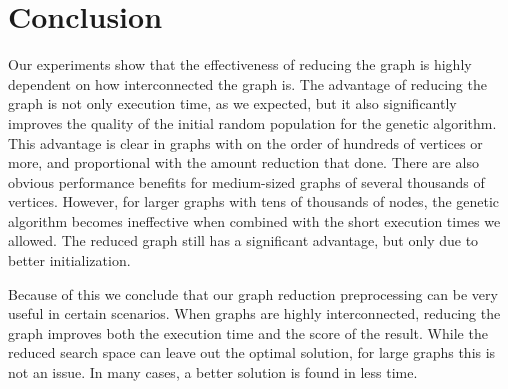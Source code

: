 \section{Conclusion}
\label{sec:conclusion}
Our experiments show that the effectiveness of reducing the graph is highly dependent on how interconnected the graph is. The advantage of reducing the graph is not only execution time, as we expected, but it also significantly improves the quality of the initial random population for the genetic algorithm. This advantage is clear in graphs with on the order of hundreds of vertices or more, and proportional with the amount reduction that done. There are also obvious performance benefits for medium-sized graphs of several thousands of vertices. However, for larger graphs with tens of thousands of nodes, the genetic algorithm becomes ineffective when combined with the short execution times we allowed. The reduced graph still has a significant advantage, but only due to better initialization.
\par
Because of this we conclude that our graph reduction preprocessing can be very useful in certain scenarios. When graphs are highly interconnected, reducing the graph improves both the execution time and the score of the result. While the reduced search space can leave out the optimal solution, for large graphs this is not an issue. In many cases, a better solution is found in less time.